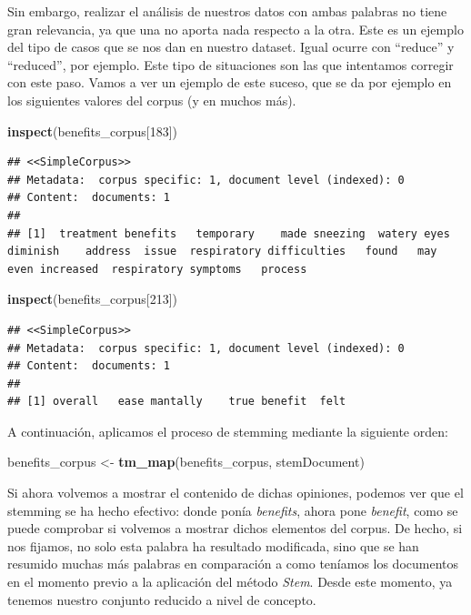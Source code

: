 \documentclass[spanish,]{article}
\newenvironment{Shaded}{\begin{snugshade}}{\end{snugshade}}
\newcommand{\DecValTok}[1]{\textcolor[rgb]{0.00,0.00,0.81}{#1}}
\newcommand{\KeywordTok}[1]{\textcolor[rgb]{0.13,0.29,0.53}{\textbf{#1}}}
\newcommand{\NormalTok}[1]{#1}
\newcommand{\StringTok}[1]{\textcolor[rgb]{0.31,0.60,0.02}{#1}}
\begin{document}
Sin embargo, realizar el análisis de nuestros datos con ambas palabras
no tiene gran relevancia, ya que una no aporta nada respecto a la otra.
Este es un ejemplo del tipo de casos que se nos dan en nuestro dataset.
Igual ocurre con ``reduce'' y ``reduced'', por ejemplo. Este tipo de
situaciones son las que intentamos corregir con este paso. Vamos a ver
un ejemplo de este suceso, que se da por ejemplo en los siguientes
valores del corpus (y en muchos más).

\begin{Shaded}
\begin{Highlighting}[]
\KeywordTok{inspect}\NormalTok{(benefits_corpus[}\DecValTok{183}\NormalTok{])}
\end{Highlighting}
\end{Shaded}

\begin{verbatim}
## <<SimpleCorpus>>
## Metadata:  corpus specific: 1, document level (indexed): 0
## Content:  documents: 1
## 
## [1]  treatment benefits   temporary    made sneezing  watery eyes diminish    address  issue  respiratory difficulties   found   may  even increased  respiratory symptoms   process
\end{verbatim}

\begin{Shaded}
\begin{Highlighting}[]
\KeywordTok{inspect}\NormalTok{(benefits_corpus[}\DecValTok{213}\NormalTok{])}
\end{Highlighting}
\end{Shaded}

\begin{verbatim}
## <<SimpleCorpus>>
## Metadata:  corpus specific: 1, document level (indexed): 0
## Content:  documents: 1
## 
## [1] overall   ease mantally    true benefit  felt
\end{verbatim}

A continuación, aplicamos el proceso de stemming mediante la siguiente
orden:

\begin{Shaded}
\begin{Highlighting}[]
\NormalTok{benefits_corpus <-}\StringTok{ }\KeywordTok{tm_map}\NormalTok{(benefits_corpus, stemDocument)}
\end{Highlighting}
\end{Shaded}

Si ahora volvemos a mostrar el contenido de dichas opiniones, podemos
ver que el stemming se ha hecho efectivo: donde ponía \textit{benefits},
ahora pone \textit{benefit}, como se puede comprobar si volvemos a
mostrar dichos elementos del corpus. De hecho, si nos fijamos, no solo
esta palabra ha resultado modificada, sino que se han resumido muchas
más palabras en comparación a como teníamos los documentos en el momento
previo a la aplicación del método \textit{Stem}. Desde este momento, ya
tenemos nuestro conjunto reducido a nivel de concepto.
\end{document}

